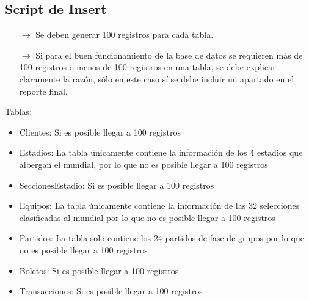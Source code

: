     
\subsection{Script de Insert}
\begin{itemize}
    \item[$\rightarrow$] Se deben generar 100 registros para cada tabla.
    \item[$\rightarrow$] Si para el buen funcionamiento de la base de datos se requieren más de 100 registros o
            menos de 100 registros en una tabla, se debe explicar claramente la razón, sólo en este caso
            sí se debe incluir un apartado en el reporte final.
\end{itemize}

Tablas:
\begin{itemize}
    \item Clientes: Si es posible llegar a 100 registros 
    \item Estadios: La tabla únicamente contiene la información de los 4 estadios que albergan el mundial, por lo que no es posible llegar a 100 registros
    \item SeccionesEstadio: Si es posible llegar a 100 registros 
    \item Equipos: La tabla únicamente contiene la información de las 32 selecciones clasificadas al mundial por lo que no es posible llegar a 100 registros
    \item Partidos: La tabla solo contiene los 24 partidos de fase de grupos por lo que no es posible llegar a 100 registros
    \item Boletos: Si es posible llegar a 100 registros 
    \item Transacciones: Si es posible llegar a 100 registros 
\end{itemize}